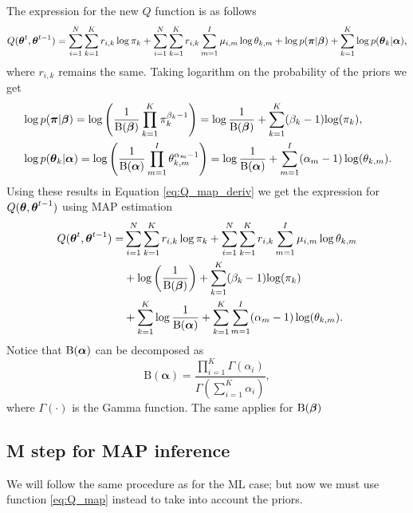 \documentclass[12pt]{article}
\begin{document}
\noindent The expression for the new $Q$ function is as follows
\begin{equation}\label{eq:Q_map_deriv}
Q(\boldsymbol\theta^t, \boldsymbol\theta^{t-1}) = \sum_{i=1}^N\sum_{k=1}^K r_{i,k}\log \pi_k + \sum_{i=1}^N\sum_{k=1}^K r_{i,k}\sum_{m=1}^I \mu_{i,m}\log \theta_{k,m} + \log p(\boldsymbol\pi|\boldsymbol\beta) + \sum\limits_{k=1}^{K}\log p(\boldsymbol\theta_k|\boldsymbol\alpha),
\end{equation}
where $r_{i,k}$ remains the same. Taking logarithm on the probability of the priors we get
\begin{align}
& \log p(\boldsymbol\pi|\boldsymbol\beta) = \log \left (\dfrac{1}{\text{B}(\boldsymbol\beta)} \prod \limits_{k=1}^{K} \pi_{k}^{\beta_{k}-1} \right )= \log \dfrac{1}{\text{B}(\boldsymbol\beta)} + \sum \limits_{k=1}^{K}(\beta_{k}-1)\text{log}(\pi_{k}),\\
& \log p(\boldsymbol\theta_{k}|\boldsymbol\alpha) = \log \left(\dfrac{1}{\text{B}(\boldsymbol\alpha)} \prod \limits_{m=1}^{I} \theta_{k,m}^{\alpha_{m}-1}\right) = \log \dfrac{1}{\text{B}(\boldsymbol\alpha)} +  \sum \limits_{m=1}^{I}(\alpha_{m}-1)\log (\theta_{k,m}).
\end{align}
\noindent Using these results in Equation \ref{eq:Q_map_deriv} we get the expression for $Q(\boldsymbol\theta,\boldsymbol\theta^{t-1})$ using MAP estimation
\begin{equation}\label{eq:Q_map}
\begin{split}
Q(\boldsymbol\theta^t, \boldsymbol\theta^{t-1}) = & \sum_{i=1}^N\sum_{k=1}^K r_{i,k}\log \pi_k + \sum_{i=1}^N\sum_{k=1}^K r_{i,k}\sum_{m=1}^I \mu_{i,m}\log \theta_{k,m} \\
& + \log \left(\dfrac{1}{\text{B}(\boldsymbol\beta)}\right) + \sum \limits_{k=1}^{K}(\beta_{k}-1)\text{log}(\pi_{k})\\
 & + \sum\limits_{k=1}^{K} \log \dfrac{1}{\text{B}(\boldsymbol\alpha)} +  \sum\limits_{k=1}^{K}\sum \limits_{m=1}^{I}(\alpha_{m}-1)\log (\theta_{k,m}).
\end{split}
\end{equation}
Notice that $\text{B}(\boldsymbol\alpha)$ can be decomposed as $$
\mathrm { B } ( \boldsymbol { \alpha } ) = \frac { \prod _ { i = 1 } ^ { K } \Gamma \left( \alpha _ { i } \right) } { \Gamma \left( \sum _ { i = 1 } ^ { K } \alpha _ { i } \right) },
$$
where $\Gamma(\cdot)$ is the Gamma function. The same applies for $\text{B}(\boldsymbol\beta)$


\subsection{M step for MAP inference}

\noindent We will follow the same procedure as for the ML case; but now we must use function \ref{eq:Q_map} instead to take into account the priors.
\end{document}
